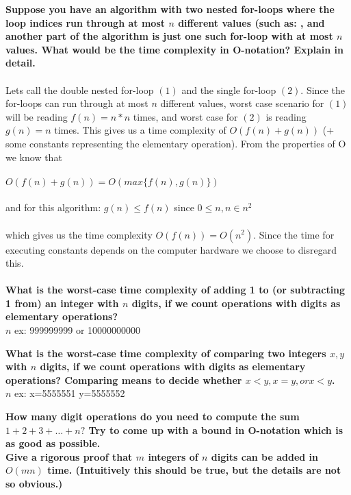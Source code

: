 \documentclass[12pt,oneside,reqno]{amsart}
\begin{document}
\textbf{Suppose you have an algorithm with two nested for-loops where the loop indices run through at most $n$ different values (such as: , and another part of the algorithm is just one such for-loop with at most $n$ values. What would be the time complexity in O-notation? Explain in detail.}\\\\
Lets call the double nested for-loop $(1)$ and the single for-loop $(2)$. Since the for-loops can run through at most $n$ different values, worst case scenario for $(1)$ will be reading $f(n)=n*n$ times, and worst case for $(2)$ is reading $g(n)=n$ times. This gives us a time complexity of $O(f(n)+g(n))$ (+ some constants representing the elementary operation). From the properties of O we know that\\\\ 
$O(f(n)+g(n))=O(max\{f(n), g(n)\})$\\\\
and for this algorithm: $g(n) \leq f(n)$ since $0 \leq n, n\in n^2$ \\\\
which gives us the time complexity $O(f(n))=O(n^2)$. Since the time for executing constants depends on the computer hardware we choose to disregard this.\\\\

\textbf{What is the worst-case time complexity of adding 1 to (or subtracting 1 from) an integer with $n$ digits, if we count operations with digits as elementary operations?}\\
$n$ ex: 999999999 or 10000000000

\textbf{What is the worst-case time complexity of comparing two integers $x, y$ with $n$ digits, if we count operations with digits as elementary operations? Comparing means to decide whether $x < y, x = y, or x < y$.}\\
$n$ ex: x=5555551 y=5555552

\textbf{How many digit operations do you need to compute the sum $1+2+3+\dots+n?$ Try to come up with a bound in O-notation which is as good as possible.}\\


\textbf{Give a rigorous proof that $m$ integers of $n$ digits can be added in $O(mn)$ time. (Intuitively this should be true, but the details are not so obvious.)}\\
\end{document}
